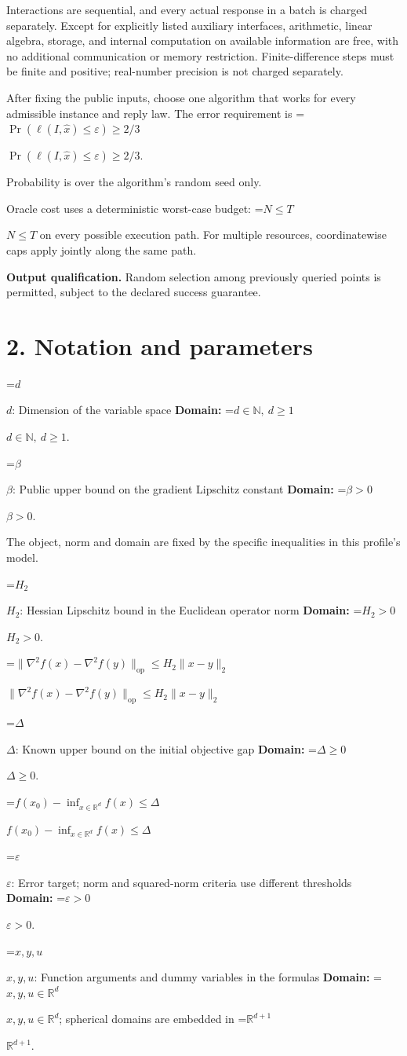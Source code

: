\documentclass[10pt,a4paper]{article}
\newcommand{\AtlasMath}[1]{\par\begingroup\centering\setbox0=\hbox{$\displaystyle #1$}\ifdim\wd0>1.4\linewidth\typeout{ATLAS WIDE FORMULA: \the\wd0}\fi\ifdim\wd0>\linewidth\resizebox{\linewidth}{!}{\box0}\else\box0\fi\par\endgroup}
\newcommand{\AtlasInlineMath}[1]{\begingroup\setbox0=\hbox{$#1$}\ifdim\wd0>.4\linewidth\endgroup\AtlasMath{#1}\else\endgroup$#1$\fi}
\begin{document}
Interactions are sequential, and every actual response in a batch is charged separately. Except for explicitly listed auxiliary interfaces, arithmetic, linear algebra, storage, and internal computation on available information are free, with no additional communication or memory restriction. Finite-difference steps must be finite and positive; real-number precision is not charged separately.

After fixing the public inputs, choose one algorithm that works for every admissible instance and reply law. The error requirement is \AtlasInlineMath{\Pr(\ell(I,\widehat{x})\le \varepsilon)\ge2/3}.

Probability is over the algorithm's random seed only.

Oracle cost uses a deterministic worst-case budget: \AtlasInlineMath{N\le T} on every possible execution path. For multiple resources, coordinatewise caps apply jointly along the same path.

\textbf{Output qualification.} Random selection among previously queried points is permitted, subject to the declared success guarantee.

\section{2. Notation and parameters}
\AtlasInlineMath{d}: Dimension of the variable space \textbf{Domain:} \AtlasInlineMath{d\in\mathbb{N},\ d\ge1}.

\AtlasInlineMath{\beta}: Public upper bound on the gradient Lipschitz constant \textbf{Domain:} \AtlasInlineMath{\beta>0}.

The object, norm and domain are fixed by the specific inequalities in this profile's model.

\AtlasInlineMath{H_2}: Hessian Lipschitz bound in the Euclidean operator norm \textbf{Domain:} \AtlasInlineMath{H_2>0}.

\AtlasInlineMath{\|\nabla^2f(x)-\nabla^2f(y)\|_{\mathrm{op}}\le H_2\|x-y\|_2}

\AtlasInlineMath{\Delta}: Known upper bound on the initial objective gap \textbf{Domain:} \AtlasInlineMath{\Delta\ge0}.

\AtlasInlineMath{f(x_0)-\inf_{x\in\mathbb{R}^d}f(x)\le\Delta}

\AtlasInlineMath{\varepsilon}: Error target; norm and squared-norm criteria use different thresholds \textbf{Domain:} \AtlasInlineMath{\varepsilon>0}.

\AtlasInlineMath{x,y,u}: Function arguments and dummy variables in the formulas \textbf{Domain:} \AtlasInlineMath{x,y,u\in\mathbb{R}^d}; spherical domains are embedded in \AtlasInlineMath{\mathbb{R}^{d+1}}.
\end{document}
